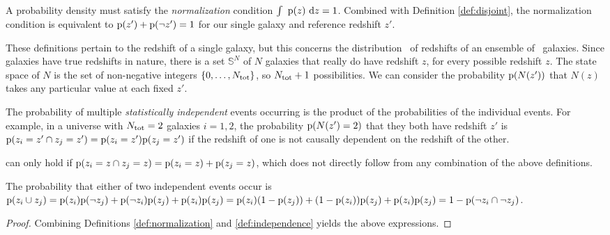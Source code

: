 \begin{definition}\label{def:normalization}
	A probability density must satisfy the \textit{normalization} condition $\int\ \mathrm{p}(z)\ \mathrm{d} z = 1$.
	Combined with Definition \ref{def:disjoint}, the normalization condition is equivalent to $\mathrm{p}(z') + \mathrm{p}(\lnot z') = 1$ for our single galaxy and reference redshift $z'$.
\end{definition}

These definitions pertain to the redshift of a single galaxy, but this \paper concerns the distribution \Nz\ of redshifts of an ensemble of \ntot\ galaxies.
Since galaxies have true redshifts in nature, there is a set $\mathbb{S}^{N}$ of $N$ galaxies that really do have redshift $z$, for every possible redshift $z$.
The state space of $N$ is the set of non-negative integers $\{0, \dots, N_{\mathrm{tot}}\}$, so $N_{\mathrm{tot}} + 1$ possibilities.
We can consider the probability $\mathrm{p}(N(z'))$ that $N(z)$ takes any particular value at each fixed $z'$.

\begin{definition}\label{def:independence}
	The probability of multiple \textit{statistically independent} events occurring is the product of the probabilities of the individual events.
	For example, in a universe with $N_{\mathrm{tot}} = 2$ galaxies $i = 1, 2$, the probability $\mathrm{p}(N(z') = 2)$ that they both have redshift $z'$ is $\mathrm{p}(z_{i} = z' \cap z_{j} = z') = \mathrm{p}(z_{i} = z') \mathrm{p}(z_{j} = z')$ if the redshift of one is not causally dependent on the redshift of the other.
\end{definition}


 can only hold if $\mathrm{p}(z_{i} = z \cap z_{j} = z) = \mathrm{p}(z_{i} = z) + \mathrm{p}(z_{j} = z)$, which does not directly follow from any combination of the above definitions.

\begin{proposition}\label{prp:union}
	The probability that either of two independent events occur is $\mathrm{p}(z_{i} \cup z_{j}) = \mathrm{p}(z_{i}) \mathrm{p}(\lnot z_{j}) + \mathrm{p}(\lnot z_{i}) \mathrm{p}(z_{j}) + \mathrm{p}(z_{i}) \mathrm{p}(z_{j}) = \mathrm{p}(z_{i}) (1 - \mathrm{p}(z_{j})) + (1 - \mathrm{p}(z_{i})) \mathrm{p}(z_{j}) + \mathrm{p}(z_{i}) \mathrm{p}(z_{j}) = 1 - \mathrm{p}(\lnot z_{i} \cap \lnot z_{j})$.
\end{proposition}
\begin{proof}
	Combining Definitions \ref{def:normalization} and \ref{def:independence} yields the above expressions.
\end{proof}

